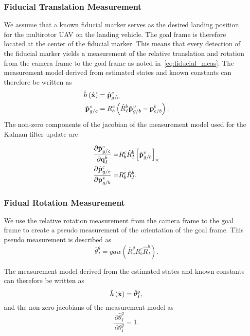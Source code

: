 \subsubsection{Fiducial Translation Measurement}
We assume that a known fiducial marker serves as the desired landing position
for the multirotor UAV on the landing vehicle. The goal frame is therefore
located at the center of the fiducial marker. This means that every detection of the fiducial
marker yields a measurement of the relative translation and rotation from the
camera frame to the goal frame as noted in~\eqref{eq:fiducial_meas}.
The measurement model derived from estimated states and known constants can
therefore be written as
\begin{align}
  \hat{h} \left( \hat{\boldsymbol{\mathrm{x}}} \right) &=
    \hat{\boldsymbol{\mathrm{p}}}_{g/c}^c \\
  \hat{\boldsymbol{\mathrm{p}}}_{g/c}^c  &= R_b^c \left( \hat{R}_I^b \hat{\boldsymbol{\mathrm{p}}}_{g/b}^v -
    \boldsymbol{\mathrm{p}}_{c/b}^b \right). 
\end{align}
The non-zero components of the jacobian of the measurement model used for the
Kalman filter update are

\begin{align}
  \frac{\partial \hat{\boldsymbol{\mathrm{p}}}_{g/c}^c}{\partial \boldsymbol{\mathrm{q}}_I^b} =& R_b^c 
  \hat{R}_I^b \left[ \hat{\boldsymbol{\mathrm{p}}}_{g/b}^v \right]_{\times} \\
    \frac{\partial \hat{\boldsymbol{\mathrm{p}}}_{g/c}^c}{\partial \boldsymbol{\mathrm{p}}_{g/b}^v} =& R_b^c
    \hat{R}_I^b.
\end{align}

\subsubsection{Fidual Rotation Measurement}
We use the relative rotation measurement from the camera frame to the goal frame
to create a pseudo measurement of the orientation of the goal frame. This pseudo
measurement is described as
\begin{equation}
  \bar{\theta}_I^g = yaw \left( \bar{R}_c^g R_b^c \hat{R}_I^b \right).
\end{equation}

The measurement model derived from the estimated states and known constants can
therefore be written as
\begin{equation}
  \hat{h} \left( \hat{\boldsymbol{\mathrm{x}}} \right) = \hat{\theta}_I^g,
\end{equation}
and the non-zero jacobians of the measurement model as
\begin{equation}
  \frac{\partial \hat{\theta}_I^g}{\partial \theta_I^g} = 1.
\end{equation}

